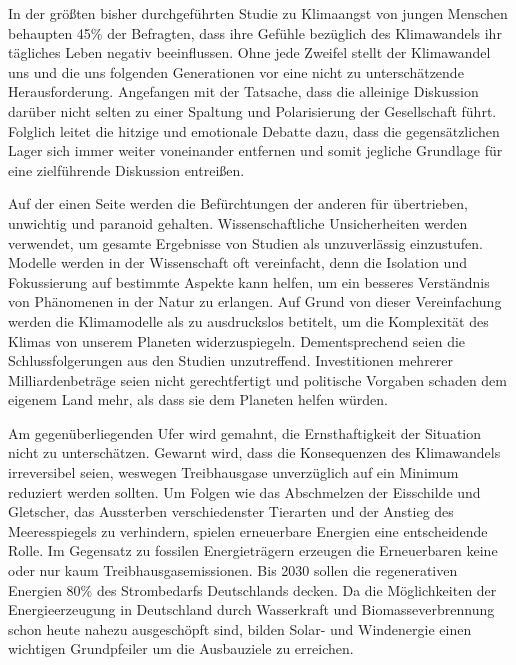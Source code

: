 \documentclass[12pt, a4paper]{article}
\begin{document}
In der größten bisher durchgeführten Studie zu Klimaangst von jungen Menschen behaupten 45\% der Befragten, dass ihre Gefühle bezüglich des Klimawandels ihr tägliches Leben negativ beeinflussen. Ohne jede Zweifel stellt der Klimawandel uns und die uns folgenden Generationen vor eine nicht zu unterschätzende Herausforderung. Angefangen mit der Tatsache, dass die alleinige Diskussion darüber nicht selten zu einer Spaltung und Polarisierung der Gesellschaft führt. Folglich leitet die hitzige und emotionale Debatte dazu, dass die gegensätzlichen Lager sich immer weiter voneinander entfernen und somit jegliche Grundlage für eine zielführende Diskussion entreißen.

Auf der einen Seite werden die Befürchtungen der anderen für übertrieben, unwichtig und paranoid gehalten. Wissenschaftliche Unsicherheiten werden verwendet, um gesamte Ergebnisse von Studien als unzuverlässig einzustufen. Modelle werden in der Wissenschaft oft vereinfacht, denn die Isolation und Fokussierung auf bestimmte Aspekte kann helfen, um ein besseres Verständnis von Phänomenen in der Natur zu erlangen. Auf Grund von dieser Vereinfachung werden die Klimamodelle als zu ausdruckslos betitelt, um die Komplexität des Klimas von unserem Planeten widerzuspiegeln. Dementsprechend seien die Schlussfolgerungen aus den Studien unzutreffend. Investitionen mehrerer Milliardenbeträge seien nicht gerechtfertigt und politische Vorgaben schaden dem eigenem Land mehr, als dass sie dem Planeten helfen würden.

Am gegenüberliegenden Ufer wird gemahnt, die Ernsthaftigkeit der Situation nicht zu unterschätzen. Gewarnt wird, dass die Konsequenzen des Klimawandels irreversibel seien, weswegen Treibhausgase unverzüglich auf ein Minimum reduziert werden sollten. Um Folgen wie das Abschmelzen der Eisschilde und Gletscher, das Aussterben verschiedenster Tierarten und der Anstieg des Meeresspiegels zu verhindern, spielen erneuerbare Energien eine entscheidende Rolle. Im Gegensatz zu fossilen Energieträgern erzeugen die Erneuerbaren keine oder nur kaum Treibhausgasemissionen. Bis 2030 sollen die regenerativen Energien 80\% des Strombedarfs Deutschlands decken. Da die Möglichkeiten der Energieerzeugung in Deutschland durch Wasserkraft und Biomasseverbrennung schon heute nahezu ausgeschöpft sind, bilden Solar- und Windenergie einen wichtigen Grundpfeiler um die Ausbauziele zu erreichen. 
\end{document}
